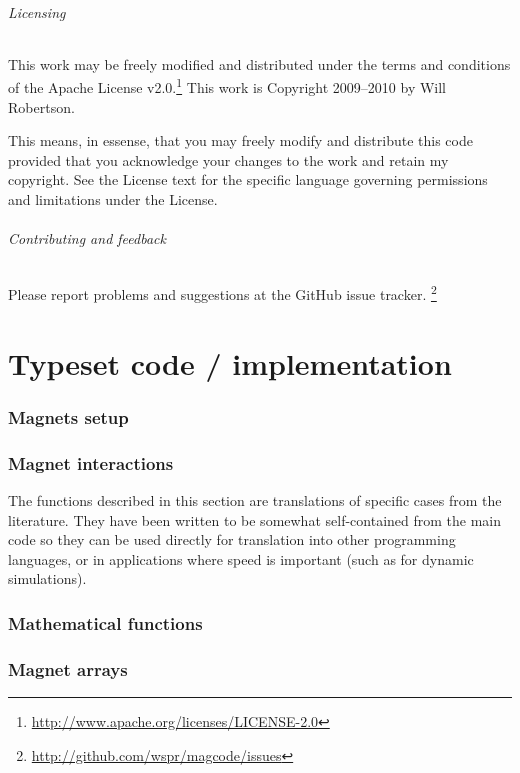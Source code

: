 \documentclass{article}
\begin{document}
\paragraph{Licensing}
This work may be freely modified and distributed under the terms and conditions of the Apache License v2.0.\footnote{\url{http://www.apache.org/licenses/LICENSE-2.0}}
This work is Copyright 2009--2010 by Will Robertson.

This means, in essense, that you may freely modify and distribute this
code provided that you acknowledge your changes to the work and retain
my copyright. See the License text for the specific language governing
permissions and limitations under the License.

\paragraph{Contributing and feedback}
Please report problems and suggestions at the GitHub issue tracker.%
\footnote{\url{http://github.com/wspr/magcode/issues}}

\printbibliography

\clearpage
\part{Typeset code / implementation}

\section{Magnets setup}


\section{Magnet interactions}

The functions described in this section are translations of specific cases from the literature. They have been written to be somewhat self-contained from the main code so they can be used directly for translation into other programming languages, or in applications where speed is important (such as for dynamic simulations).



\section{Mathematical functions}


\section{Magnet arrays}

\end{document}
